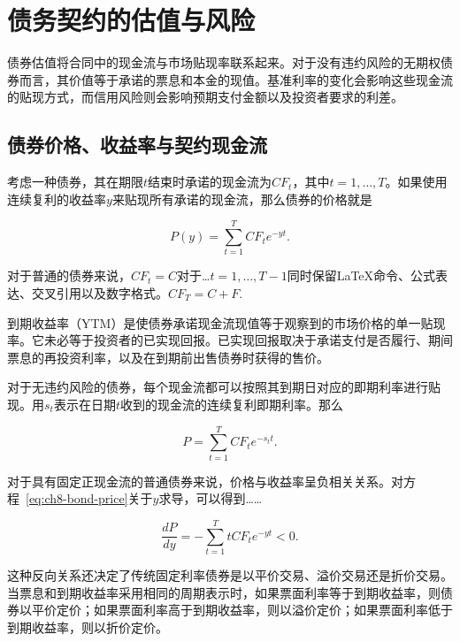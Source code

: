 \section{债务契约的估值与风险}

债券估值将合同中的现金流与市场贴现率联系起来。对于没有违约风险的无期权债券而言，其价值等于承诺的票息和本金的现值。基准利率的变化会影响这些现金流的贴现方式，而信用风险则会影响预期支付金额以及投资者要求的利差。

\subsection{债券价格、收益率与契约现金流}

考虑一种债券，其在期限$t$结束时承诺的现金流为$CF_t$，其中$t=1,\ldots,T$。如果使用连续复利的收益率$y$来贴现所有承诺的现金流，那么债券的价格就是

\begin{equation}
P(y)
=
\sum_{t=1}^{T}
CF_t e^{-yt}.
\label{eq:ch8-bond-price}
\end{equation}

对于普通的债券来说，$CF_t=C$对于…$t=1,\ldots,T-1$同时保留LaTeX命令、公式表达、交叉引用以及数字格式。$CF_T=C+F$.

到期收益率（YTM）是使债券承诺现金流现值等于观察到的市场价格的单一贴现率。它未必等于投资者的已实现回报。已实现回报取决于承诺支付是否履行、期间票息的再投资利率，以及在到期前出售债券时获得的售价。

对于无违约风险的债券，每个现金流都可以按照其到期日对应的即期利率进行贴现。用$s_t$表示在日期$t$收到的现金流的连续复利即期利率。那么

\begin{equation}
P
=
\sum_{t=1}^{T}
CF_t e^{-s_t t}.
\label{eq:ch8-bond-price-spot-rates}
\end{equation}

对于具有固定正现金流的普通债券来说，价格与收益率呈负相关关系。对方程~\ref{eq:ch8-bond-price}关于$y$求导，可以得到……

\begin{equation}
\frac{dP}{dy}
=
-\sum_{t=1}^{T}
tCF_t e^{-yt}
<0.
\label{eq:ch8-price-yield-negative}
\end{equation}

这种反向关系还决定了传统固定利率债券是以平价交易、溢价交易还是折价交易。当票息和到期收益率采用相同的周期表示时，如果票面利率等于到期收益率，则债券以平价定价；如果票面利率高于到期收益率，则以溢价定价；如果票面利率低于到期收益率，则以折价定价。

